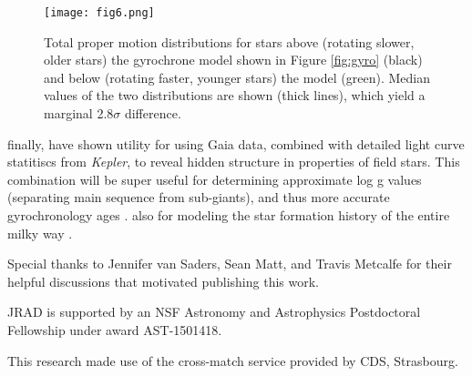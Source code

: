 \documentclass[manuscript, letterpaper]{aastex6}
\newcommand{\Kepler}{\textsl{Kepler}\xspace}
\begin{document}
\begin{figure}[]
\centering
\texttt{[image: fig6.png]}
\caption{Total proper motion distributions for stars above (rotating slower, older stars) the gyrochrone model shown in Figure \ref{fig:gyro} (black) and below (rotating faster, younger stars) the model (green). Median values of the two distributions are shown (thick lines), which yield a marginal 2.8$\sigma$ difference.
}
\label{fig:pm}
\end{figure}


finally, %
have shown utility for using Gaia data, combined with detailed light curve statitiscs from \Kepler, to reveal hidden structure in properties of field stars. This combination will be super useful for determining approximate log g values (separating main sequence from sub-giants), and thus more accurate gyrochronology ages \citep{van-saders2013}. also for modeling the star formation history of the entire milky way \citep[e.g.][]{bertelli1999}.



\acknowledgments
Special thanks to Jennifer van Saders, Sean Matt, and Travis Metcalfe for their helpful discussions that motivated publishing this work.

JRAD is supported by an NSF Astronomy and Astrophysics Postdoctoral Fellowship under award AST-1501418.

This research made use of the cross-match service provided by CDS, Strasbourg.


\end{document}

